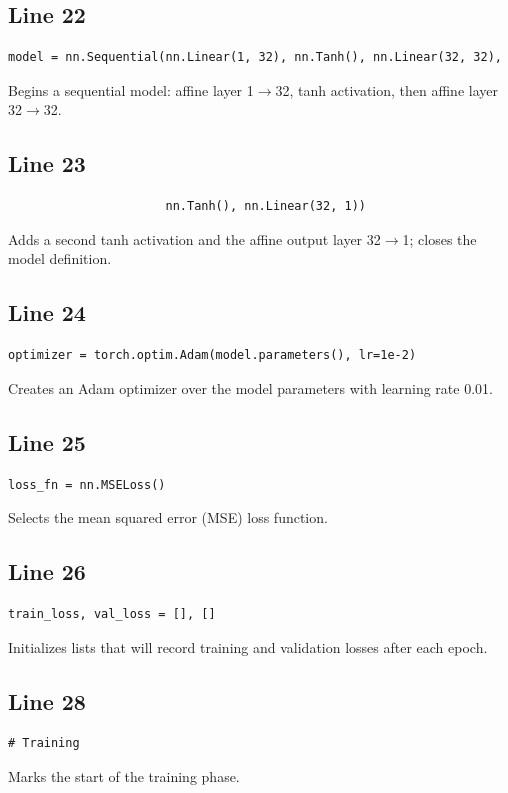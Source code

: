 \documentclass[11pt,a4paper]{article}
\begin{document}
\subsection*{Line 22}
\begin{lstlisting}
model = nn.Sequential(nn.Linear(1, 32), nn.Tanh(), nn.Linear(32, 32),
\end{lstlisting}
Begins a sequential model: affine layer 1$\to$32, tanh activation, then affine layer 32$\to$32.

\subsection*{Line 23}
\begin{lstlisting}
                      nn.Tanh(), nn.Linear(32, 1))
\end{lstlisting}
Adds a second tanh activation and the affine output layer 32$\to$1; closes the model definition.

\subsection*{Line 24}
\begin{lstlisting}
optimizer = torch.optim.Adam(model.parameters(), lr=1e-2)
\end{lstlisting}
Creates an Adam optimizer over the model parameters with learning rate 0.01.

\subsection*{Line 25}
\begin{lstlisting}
loss_fn = nn.MSELoss()
\end{lstlisting}
Selects the mean squared error (MSE) loss function.

\subsection*{Line 26}
\begin{lstlisting}
train_loss, val_loss = [], []
\end{lstlisting}
Initializes lists that will record training and validation losses after each epoch.

\subsection*{Line 28}
\begin{lstlisting}
# Training
\end{lstlisting}
Marks the start of the training phase.
\end{document}
